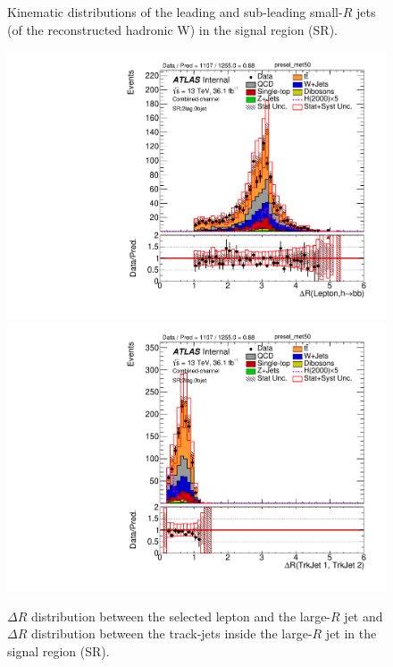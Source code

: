\begin{figure}[!ht]
\begin{center}
\caption{Kinematic distributions of the leading and sub-leading small-$R$ jets (of the reconstructed hadronic W) 
in the signal region (SR).}
\label{fig:boosted_SR_whad_jets}
\end{center}
\end{figure}

\begin{figure}[!h]
\begin{center}
\includegraphics[scale=0.33]{./figures/boosted/PlotsInMbbSR/Unblinded/DataMC_2tag_0bjet_SR_lepton_presel_met50_drHbbLep}
\includegraphics[scale=0.33]{./figures/boosted/PlotsInMbbSR/Unblinded/DataMC_2tag_0bjet_SR_lepton_presel_met50_drbtrkjet1btrkjet2} \\
\caption{$\Delta R$ distribution between the selected lepton and the large-$R$ jet and $\Delta R$ distribution between the track-jets inside
the large-$R$ jet in the signal region (SR).}
\label{fig:boosted_SR_dr}
\end{center}
\end{figure}
